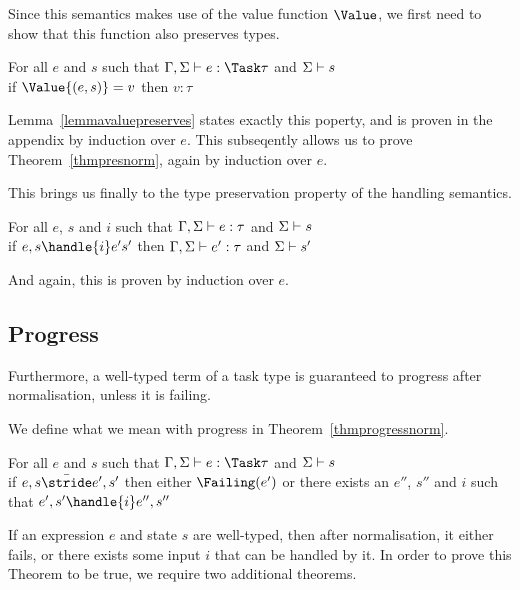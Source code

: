 Since this semantics makes use of the value function $\Value$, we first need to
show that this function also preserves types.

\begin{lemma}
  For all $e$ and $s$ such that $\Gamma,\Sigma\infers e:\Task\tau$ and $\Sigma\vdash s$\\
  if $\Value{(e,s)}=v$ then $v:\tau$
  \label{lemmavaluepreserves}
\end{lemma}

Lemma~\ref{lemmavaluepreserves} states exactly this poperty, and is proven in the
appendix by induction over $e$. This subseqently allows us to prove
Theorem~\ref{thmpresnorm}, again by induction over $e$.

This brings us finally to the type preservation property of the handling semantics.

\begin{theorem}
  For all $e$, $s$ and $i$ such that $\Gamma,\Sigma\vdash e:\tau$ and $\Sigma\vdash s$\\
  if $ e,s \handle{i} e's'$ then $\Gamma,\Sigma\vdash e':\tau$ and $\Sigma\vdash s'$
   \label{thmpreshandle}
\end{theorem}

And again, this is proven by induction over $e$.



\subsection{Progress}

Furthermore, a well-typed term of a task type is guaranteed to progress after
normalisation, unless it is failing.

We define what we mean with progress in Theorem~\ref{thmprogressnorm}.

\begin{theorem}
  For all $e$ and $s$ such that $\Gamma,\Sigma\infers e:\Task\tau$ and $\Sigma\vdash s$\\
  if $e,s \bar{\stride} e',s'$ then either $\Failing(e')$ or there exists an $e''$, $s''$ and $i$ such that $e',s'\handle{i}e'',s''$
  \label{thmprogressnorm}
\end{theorem}

If an expression $e$ and state $s$ are well-typed, then after normalisation, it
either fails, or there exists some input $i$ that can be handled by it.
In order to prove this Theorem to be true, we require two additional theorems.

